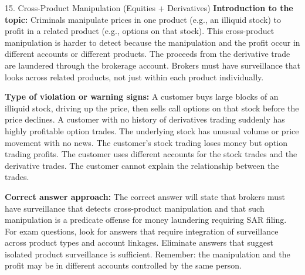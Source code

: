 \documentclass[11pt,a4paper]{beamer}
\begin{document}
\begin{frame}{15. Cross-Product Manipulation (Equities + Derivatives)}
\tiny
\noindent\textbf{Introduction to the topic:} Criminals manipulate prices in one product (e.g., an illiquid stock) to profit in a related product (e.g., options on that stock). This cross-product manipulation is harder to detect because the manipulation and the profit occur in different accounts or different products. The proceeds from the derivative trade are laundered through the brokerage account. Brokers must have surveillance that looks across related products, not just within each product individually.

\vspace{0.1cm}
\noindent\textbf{Type of violation or warning signs:} A customer buys large blocks of an illiquid stock, driving up the price, then sells call options on that stock before the price declines. A customer with no history of derivatives trading suddenly has highly profitable option trades. The underlying stock has unusual volume or price movement with no news. The customer's stock trading loses money but option trading profits. The customer uses different accounts for the stock trades and the derivative trades. The customer cannot explain the relationship between the trades.

\vspace{0.1cm}
\noindent\textbf{Correct answer approach:} The correct answer will state that brokers must have surveillance that detects cross-product manipulation and that such manipulation is a predicate offense for money laundering requiring SAR filing. For exam questions, look for answers that require integration of surveillance across product types and account linkages. Eliminate answers that suggest isolated product surveillance is sufficient. Remember: the manipulation and the profit may be in different accounts controlled by the same person.
\end{frame}
\end{document}
